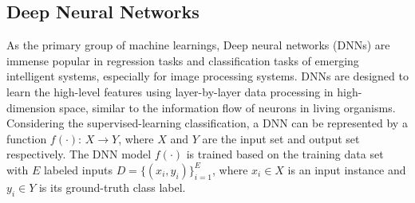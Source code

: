 \documentclass[lettersize,journal]{IEEEtran}
\begin{document}

\subsection{Deep Neural Networks}
As the primary group of machine learnings, Deep neural networks (DNNs) are immense popular in regression tasks and classification tasks of emerging intelligent systems, especially for image processing systems. DNNs are designed to learn the high-level features using layer-by-layer data processing in high-dimension space, similar to the information flow of neurons in living organisms. Considering the supervised-learning classification, a DNN can be represented by a function $f(\cdot)$: $X \to Y$, where $X$ and $Y$ are the input set and output set respectively. The DNN model $f(\cdot)$ is trained based on the training data set with $E$ labeled inputs $D = \{(x_i,y_i)\}_{i=1}^E$, where $x_i \in X$ is an input instance and $y_i \in Y$ is its ground-truth class label.

\end{document}
